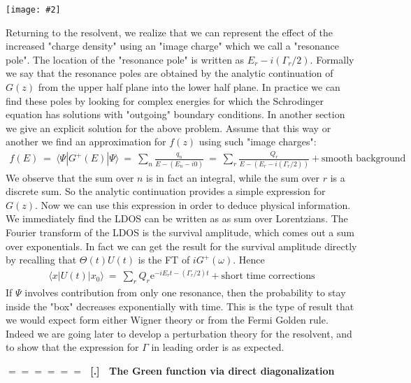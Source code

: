 \documentclass[onecolumn,fleqn]{revtex4}
\newcommand{\eexp}{\mathrm{e}^}
\newcommand{\putgraph}[2][0.30\hsize]{\texttt{[image: \#2]}}
\newcommand{\beq}{\begin{eqnarray}}
\newcommand{\eeq}{\end{eqnarray}}
\renewcommand{\thesubsection}{\arabic{subsection}}
\renewcommand{\thesubsubsection}{\arabic{subsubsection}}
\newcommand{\sheadC}[1]
{
\addtocounter{subsubsection}{1}
\vspace{5mm}
{\Large\bf $=\!=\!=\!=\!=\!=\;$ [\thesubsection.\thesubsubsection] \ #1}  
\nopagebreak
\phantomsection
}
\begin{document}
\begin{center}
\putgraph[0.8\hsize]{ImageCharge} 
\end{center}


Returning to the resolvent, we realize that we can 
represent the effect of the increased "charge density"  
using an "image charge" which we call a "resonance pole". 
The location of the "resonance pole" is written as $E_r-i(\Gamma_r/2)$.
Formally we say that the resonance poles are 
obtained by the analytic continuation of $G(z)$ from the 
upper half plane into the lower half plane. 
In practice we can find these poles by looking for 
complex energies for which the Schrodinger equation 
has solutions with "outgoing" boundary conditions.    
In another section we give an explicit solution 
for the above problem. Assume that this way or another 
we find an approximation for $f(z)$ using such "image charges":
\beq
f(E) \ = \ \langle \Psi | G^{+}(E) | \Psi \rangle 
\ = \ \sum_n \frac{q_n}{E-(E_n-i0)} 
\ = \  \sum_r \frac{Q_r}{E-(E_r-i(\Gamma_r/2))}
+ \mbox{smooth background} 
\eeq
We observe that the sum over $n$ is in fact an integral, 
while the sum over $r$ is a discrete sum. 
So the analytic continuation provides a simple 
expression for $G(z)$. Now we can use this 
expression in order to deduce physical information. 
We immediately find the LDOS can 
be written as as sum over Lorentzians. 
The Fourier transform of the LDOS is the 
survival amplitude, which comes out a sum over 
exponentials. In fact we can get the result 
for the  survival amplitude directly by 
recalling that $\Theta(t)U(t)$ is the FT of $iG^{+}(\omega)$.  
Hence 
\beq
\langle x| U(t) | x_0 \rangle \ = \ 
\sum_r Q_r \eexp{ -iE_rt - (\Gamma_r/2)t }
+ \mbox{short time corrections} 
\eeq
If $\Psi$ involves contribution from only  
one resonance, then the probability to stay 
inside the "box"  decreases exponentially with time. 
This is the type of result that we would expect 
form either Wigner theory or from the Fermi Golden rule. 
Indeed we are going later to develop  
a perturbation theory for the resolvent, 
and to show that the expression for $\Gamma$ 
in leading order is as expected.



\sheadC{The Green function via direct diagonalization}
\end{document}
